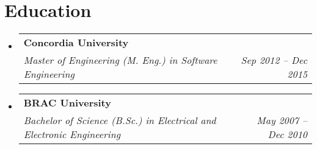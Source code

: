 \documentclass[a4paper,11pt]{article}
\makeatletter
\newcommand{\resumeQuadHeading}[4]{
  \item
  \begin{tabular*}{0.96\textwidth}[t]{l@{\extracolsep{\fill}}r}
    \textbf{#1} & #2 \\
    \textit{\small#3} & \textit{\small #4} \\
  \end{tabular*}
}
\newcommand{\resumeHeadingListStart}{
  \begin{itemize}[leftmargin=0.15in, label={}]
}
\newcommand{\resumeHeadingListEnd}{\end{itemize}}
\makeatother
\begin{document}

\section{Education}
  \resumeHeadingListStart{}
    \resumeQuadHeading{Concordia University}{}
    {Master of Engineering (M. Eng.) in Software Engineering}{Sep 2012 -- Dec 2015}
    \resumeQuadHeading{BRAC University}{}
    {Bachelor of Science (B.Sc.) in Electrical and Electronic Engineering}{May 2007 -- Dec 2010}
  \resumeHeadingListEnd{}
\end{document}

